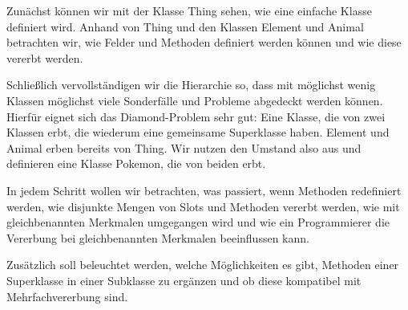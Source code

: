 Zunächst können wir mit der Klasse Thing sehen, wie eine einfache Klasse definiert wird. Anhand von Thing und den Klassen Element und Animal betrachten wir, wie Felder und Methoden definiert werden können und wie diese vererbt werden.

Schließlich vervollständigen wir die Hierarchie so, dass mit möglichst wenig Klassen möglichst viele Sonderfälle und Probleme abgedeckt werden können. Hierfür eignet sich das Diamond-Problem sehr gut: Eine Klasse, die von zwei Klassen erbt, die wiederum eine gemeinsame Superklasse haben. Element und Animal erben bereits von Thing. Wir nutzen den Umstand also aus und definieren eine Klasse Pokemon, die von beiden erbt.

In jedem Schritt wollen wir betrachten, was passiert, wenn Methoden redefiniert werden, wie disjunkte Mengen von Slots und Methoden vererbt werden, wie mit gleichbenannten Merkmalen umgegangen wird und wie ein Programmierer die Vererbung bei gleichbenannten Merkmalen beeinflussen kann.

Zusätzlich soll beleuchtet werden, welche Möglichkeiten es gibt, Methoden einer Superklasse in einer Subklasse zu ergänzen und ob diese kompatibel mit Mehrfachvererbung sind.